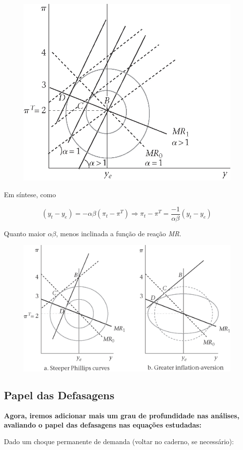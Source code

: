\documentclass[a4paper,12pt]{article}[abntex2]
\begin{document}
\begin{figure}[H]
    \centering
    \includegraphics[width=0.7\linewidth]{Imagens/a15i9.png}
\end{figure}

Em síntese, como

\[
(y_t - y_e) = -\alpha \beta \left(\pi_t - \pi^T\right) \Rightarrow \pi_t - \pi^T = \frac{-1}{\alpha \beta} (y_t - y_e)
\]

Quanto maior $\alpha \beta$, menos inclinada a função de reação \textit{MR}.


\begin{figure}[H]
    \centering
    \includegraphics[width=0.7\linewidth]{Imagens/a15i10.png}
\end{figure}

\subsection{\textbf{Papel das Defasagens}}

\textbf{Agora, iremos adicionar mais um grau de profundidade nas análises, avaliando o papel das defasagens nas equações estudadas:}

Dado um choque permanente de demanda (voltar no caderno, se necessário):
\end{document}

